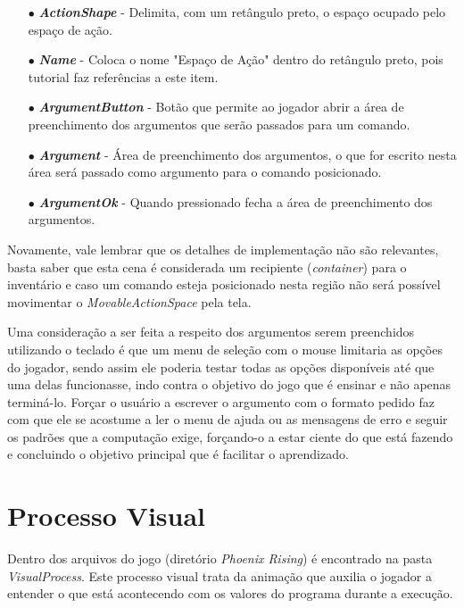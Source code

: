 \begin{itemize}
    \item[$\bullet$]
        \textbf{\textit{ActionShape}} - Delimita, com um retângulo preto, o
        espaço ocupado pelo espaço de ação.  
    \item[$\bullet$]
        \textbf{\textit{Name}} - Coloca o nome "Espaço de Ação" dentro do 
        retângulo preto, pois tutorial faz referências a este item. 
    \item[$\bullet$]
        \textbf{\textit{ArgumentButton}} - Botão que permite ao jogador 
        abrir a área de preenchimento dos argumentos que serão passados para um 
        comando.
    \item[$\bullet$]
        \textbf{\textit{Argument}} - Área de preenchimento dos argumentos, 
        o que for escrito nesta área será passado como argumento para o comando
        posicionado.  
    \item[$\bullet$]
        \textbf{\textit{ArgumentOk}} - Quando pressionado fecha a área de 
        preenchimento dos argumentos.
\end{itemize}

Novamente, vale lembrar que os detalhes de implementação não são relevantes, 
basta saber que esta cena é considerada um recipiente (\textit{container}) para 
o inventário e caso um comando esteja posicionado nesta região não será possível
movimentar o \textit{MovableActionSpace} pela tela.

Uma consideração a ser feita a respeito dos argumentos serem preenchidos 
utilizando o teclado é que um menu de seleção com o mouse limitaria as opções
do jogador, sendo assim ele poderia testar todas as opções disponíveis até que 
uma delas funcionasse, indo contra o objetivo do jogo que é ensinar e não apenas 
terminá-lo. Forçar o usuário a escrever o argumento com o formato pedido faz com
que ele se acostume a ler o menu de ajuda ou as mensagens de erro e seguir os 
padrões que a computação exige, forçando-o a estar ciente do que está fazendo e
concluindo o objetivo principal que é facilitar o aprendizado.

\section{Processo Visual}

Dentro dos arquivos do jogo (diretório \textit{Phoenix Rising}) é encontrado na
pasta \textit{VisualProcess}. Este processo visual trata da animação que auxilia
o jogador a entender o que está acontecendo com os valores do programa durante
a execução.

